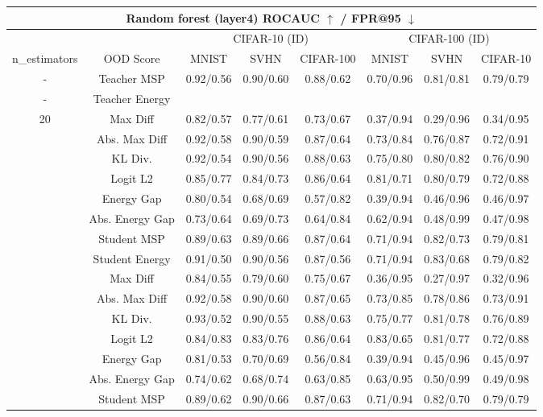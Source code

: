 \documentclass[border=2pt]{standalone}
\begin{document}
\setlength{\tabcolsep}{5pt}
\begin{tabular}{cccccccc}
\multicolumn{8}{c}{\textbf{Random forest (layer4) ROCAUC $\uparrow$ / FPR@95 $\downarrow$}}\\[4pt]
\toprule
 &  & \multicolumn{3}{c}{CIFAR-10 (ID)} & \multicolumn{3}{c}{CIFAR-100 (ID)} \\
\cmidrule(lr){3-5} \cmidrule(lr){6-8}
n\_estimators & OOD Score & MNIST & SVHN & CIFAR-100 & MNIST & SVHN & CIFAR-10 \\
\midrule
- & Teacher MSP & 0.92/0.56 & 0.90/0.60 & 0.88/0.62 & 0.70/0.96 & 0.81/0.81 & 0.79/0.79 \\
- & Teacher Energy & & & & & & \\
\midrule
20 & Max Diff & 0.82/0.57 & 0.77/0.61 & 0.73/0.67 & 0.37/0.94 & 0.29/0.96 & 0.34/0.95 \\
 & Abs. Max Diff & 0.92/0.58 & 0.90/0.59 & 0.87/0.64 & 0.73/0.84 & 0.76/0.87 & 0.72/0.91 \\
 & KL Div. & 0.92/0.54 & 0.90/0.56 & 0.88/0.63 & 0.75/0.80 & 0.80/0.82 & 0.76/0.90 \\
 & Logit L2 & 0.85/0.77 & 0.84/0.73 & 0.86/0.64 & 0.81/0.71 & 0.80/0.79 & 0.72/0.88 \\
 & Energy Gap & 0.80/0.54 & 0.68/0.69 & 0.57/0.82 & 0.39/0.94 & 0.46/0.96 & 0.46/0.97 \\
 & Abs. Energy Gap & 0.73/0.64 & 0.69/0.73 & 0.64/0.84 & 0.62/0.94 & 0.48/0.99 & 0.47/0.98 \\
 & Student MSP & 0.89/0.63 & 0.89/0.66 & 0.87/0.64 & 0.71/0.94 & 0.82/0.73 & 0.79/0.81 \\
 & Student Energy & 0.91/0.50 & 0.90/0.56 & 0.87/0.56 & 0.71/0.94 & 0.83/0.68 & 0.79/0.82 \\
\addlinespace
50 & Max Diff & 0.84/0.55 & 0.79/0.60 & 0.75/0.67 & 0.36/0.95 & 0.27/0.97 & 0.32/0.96 \\
 & Abs. Max Diff & 0.92/0.58 & 0.90/0.60 & 0.87/0.65 & 0.73/0.85 & 0.78/0.86 & 0.73/0.91 \\
 & KL Div. & 0.93/0.52 & 0.90/0.55 & 0.88/0.63 & 0.75/0.77 & 0.81/0.78 & 0.76/0.89 \\
 & Logit L2 & 0.84/0.83 & 0.83/0.76 & 0.86/0.64 & 0.83/0.65 & 0.81/0.77 & 0.72/0.88 \\
 & Energy Gap & 0.81/0.53 & 0.70/0.69 & 0.56/0.84 & 0.39/0.94 & 0.45/0.96 & 0.45/0.97 \\
 & Abs. Energy Gap & 0.74/0.62 & 0.68/0.74 & 0.63/0.85 & 0.63/0.95 & 0.50/0.99 & 0.49/0.98 \\
 & Student MSP & 0.89/0.62 & 0.90/0.66 & 0.87/0.63 & 0.71/0.94 & 0.82/0.70 & 0.79/0.79 \\

\end{tabular}
\end{document}
